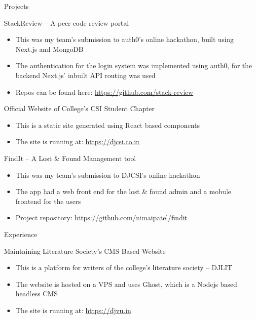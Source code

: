 \documentclass{article}
\newlength{\tabin}
\newlength{\secsep}
\newcommand{\lineunder}{\vspace*{-8pt} \\ \hspace*{-6pt} \hrulefill \\ \vspace*{-15pt}}
\newenvironment{tabbedsection}[1]{
  \begin{list}{}{
      \setlength{\itemsep}{0pt}
      \setlength{\labelsep}{0pt}
      \setlength{\labelwidth}{0pt}
      \setlength{\leftmargin}{\tabin}
      \setlength{\rightmargin}{\tabin}
      \setlength{\listparindent}{0pt}
      \setlength{\parsep}{0pt}
      \setlength{\parskip}{0pt}
      \setlength{\partopsep}{0pt}
      \setlength{\topsep}{#1}
    }
  \item[]
}{\end{list}}
\newenvironment{resume_section}[1]{
  \filbreak
  \vspace{2\secsep}
  \textsc{\large#1}
  \lineunder
  \begin{tabbedsection}{\secsep}
}{\end{tabbedsection}}
\newenvironment{resume_subsection}[2][]{
  \textbf{#2} \hfill {\footnotesize #1} \hspace{2em}
  \begin{tabbedsection}{0.5\secsep}
}{\end{tabbedsection}}
\newenvironment{subitems}{
  \renewcommand{\labelitemi}{-}
  \begin{itemize}
      \setlength{\labelsep}{1em}
}{\end{itemize}}
\begin{document}
\begin{resume_section}{Projects}

    \begin{resume_subsection}{StackReview -- A peer code review portal}
        \begin{subitems}
            \item This was my team's submission to auth0's online hackathon, built using Next.js and MongoDB
            \item The authentication for the login system was implemented using auth0, for the backend Next.js' inbuilt API routing was used
            \item Repos can be found here: \href{https://github.com/stack-review}{https://github.com/stack-review}
        \end{subitems}
    \end{resume_subsection}

    \begin{resume_subsection}{Official Website of College's CSI Student Chapter}
        \begin{subitems}
            \item This is a static site generated using React based components
            \item The site is running at: \href{https://djcsi.co.in}{https://djcsi.co.in}
        \end{subitems}
    \end{resume_subsection}

	\begin{resume_subsection}{FindIt -- A Lost & Found Management tool}
        \begin{subitems}
            \item This was my team's submission to DJCSI's online hackathon
	    \item The app had a web front end for the lost & found admin and a mobule frontend for the users
            \item Project repository: \href{https://github.com/nimaipatel/findit}{https://github.com/nimaipatel/findit}
        \end{subitems}
    \end{resume_subsection}

\end{resume_section}

\begin{resume_section}{Experience}
    \begin{resume_subsection}{Maintaining Literature Society's CMS Based Website}
        \begin{subitems}
            \item This is a platform for writers of the college's literature society -- DJLIT
            \item The website is hosted on a VPS and uses Ghost, which is a Nodejs based headless CMS
            \item The site is running at: \href{https://djvu.in}{https://djvu.in}
        \end{subitems}
    \end{resume_subsection}
\end{resume_section}
\end{document}

